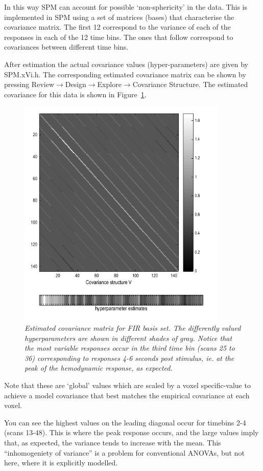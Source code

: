 In this way SPM can account for possible `non-sphericity' in the data. This is implemented in SPM using a set of matrices (bases) that characterise the covariance matrix. The first 12 correspond to the variance of each of the responses in 
each of the 12 time bins. The ones that follow  correspond to covariances between different time bins.

After estimation the actual covariance values (hyper-parameters) are given by SPM.xVi.h. The corresponding estimated 
covariance matrix can be shown by pressing Review$\rightarrow$Design$\rightarrow$Explore$\rightarrow$Covariance Structure. The estimated covariance for this data is shown in Figure~\ref{fir_covariance}.
\begin{figure}
\begin{center}
\includegraphics[width=100mm]{faces_group/fir_covariance}
\caption{\em Estimated covariance matrix for FIR basis set. The differently valued hyperparameters are shown in different shades of gray. Notice that the most variable responses occur in the third time bin (scans 25 to 36) corresponding to responses 4-6 seconds post stimulus, ie. at the peak of the hemodynamic response, as expected. \label{fir_covariance}}
\end{center}
\end{figure}
Note that these are `global' values which are scaled by a voxel specific-value to achieve a model covariance that best matches the empirical covariance at each voxel. 

You can see the highest values on the leading diagonal occur for timebins 2-4 (scans 13-48). This is where the peak response occurs, and the large values imply that, as expected, the variance tends to increase with the mean. This ``inhomogeniety of variance'' is a problem for conventional ANOVAs, but not here, where it is explicitly modelled.


